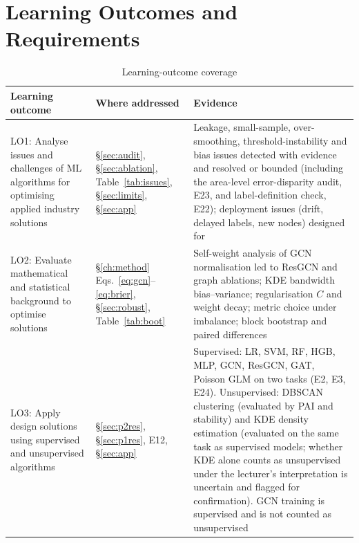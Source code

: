 \documentclass[11pt,a4paper]{report}
\begin{document}
\chapter{Learning Outcomes and Requirements}
\label{app:lo}
\begin{table}[H]
\centering\scriptsize
\caption{Learning-outcome coverage}
\label{tab:lo}
\begin{tabularx}{\textwidth}{@{}L{3.2cm} L{3.4cm} Y@{}}
\toprule
Learning outcome & Where addressed & Evidence\\
\midrule
LO1: Analyse issues and challenges of ML algorithms for optimising applied industry solutions & \S\ref{sec:audit}, \S\ref{sec:ablation}, Table~\ref{tab:issues}, \S\ref{sec:limits}, \S\ref{sec:app} & Leakage, small-sample, over-smoothing, threshold-instability and bias issues detected with evidence and resolved or bounded (including the area-level error-disparity audit, E23, and label-definition check, E22); deployment issues (drift, delayed labels, new nodes) designed for\\
LO2: Evaluate mathematical and statistical background to optimise solutions & \S\ref{ch:method} Eqs.~\ref{eq:gcn}--\ref{eq:brier}, \S\ref{sec:robust}, Table~\ref{tab:boot} & Self-weight analysis of GCN normalisation led to ResGCN and graph ablations; KDE bandwidth bias--variance; regularisation $C$ and weight decay; metric choice under imbalance; block bootstrap and paired differences\\
LO3: Apply design solutions using supervised and unsupervised algorithms & \S\ref{sec:p2res}, \S\ref{sec:p1res}, E12, \S\ref{sec:app} & Supervised: LR, SVM, RF, HGB, MLP, GCN, ResGCN, GAT, Poisson GLM on two tasks (E2, E3, E24). Unsupervised: DBSCAN clustering (evaluated by PAI and stability) and KDE density estimation (evaluated on the same task as supervised models; whether KDE alone counts as unsupervised under the lecturer's interpretation is uncertain and flagged for confirmation). GCN training is supervised and is not counted as unsupervised\\
\bottomrule
\end{tabularx}
\end{table}
\end{document}
